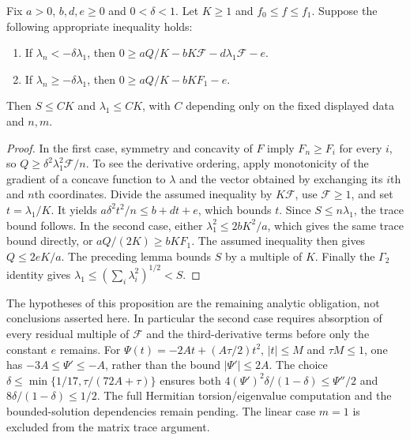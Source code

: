 \begin{proposition}\label{draft:599-conditional-maximal-eigenvalue-bound}
Fix $a>0$, $b,d,e\geq0$ and $0<\delta<1$. Let $K\geq1$ and $f_0\leq f\leq f_1$. Suppose the following appropriate inequality holds:
\begin{enumerate}
\item If $\lambda_n<-\delta\lambda_1$, then $0\geq aQ/K-bK\mathcal F-d\lambda_1\mathcal F-e$.
\item If $\lambda_n\geq-\delta\lambda_1$, then $0\geq aQ/K-bKF_1-e$.
\end{enumerate}
Then $S\leq CK$ and $\lambda_1\leq CK$, with $C$ depending only on the fixed displayed data and $n,m$.
\end{proposition}
\begin{proof}
In the first case, symmetry and concavity of $F$ imply $F_n\geq F_i$ for every $i$, so $Q\geq\delta^2\lambda_1^2\mathcal F/n$. To see the derivative ordering, apply monotonicity of the gradient of a concave function to $\lambda$ and the vector obtained by exchanging its $i$th and $n$th coordinates. Divide the assumed inequality by $K\mathcal F$, use $\mathcal F\geq1$, and set $t=\lambda_1/K$. It yields $a\delta^2t^2/n\leq b+dt+e$, which bounds $t$. Since $S\leq n\lambda_1$, the trace bound follows.
In the second case, either $\lambda_1^2\leq2bK^2/a$, which gives the same trace bound directly, or $aQ/(2K)\geq bKF_1$. The assumed inequality then gives $Q\leq2eK/a$. The preceding lemma bounds $S$ by a multiple of $K$. Finally the $\Gamma_2$ identity gives $\lambda_1\leq(\sum_i\lambda_i^2)^{1/2}<S$.
\end{proof}

The hypotheses of this proposition are the remaining analytic obligation, not conclusions asserted here. In particular the second case requires absorption of every residual multiple of $\mathcal F$ and the third-derivative terms before only the constant $e$ remains. For $\Psi(t)=-2At+(A\tau/2)t^2$, $|t|\leq M$ and $\tau M\leq1$, one has $-3A\leq\Psi'\leq-A$, rather than the bound $|\Psi'|\leq2A$. The choice $\delta\leq\min\{1/17,\tau/(72A+\tau)\}$ ensures both $4(\Psi')^2\delta/(1-\delta)\leq\Psi''/2$ and $8\delta/(1-\delta)\leq1/2$. The full Hermitian torsion/eigenvalue computation and the bounded-solution dependencies remain pending. The linear case $m=1$ is excluded from the matrix trace argument.
